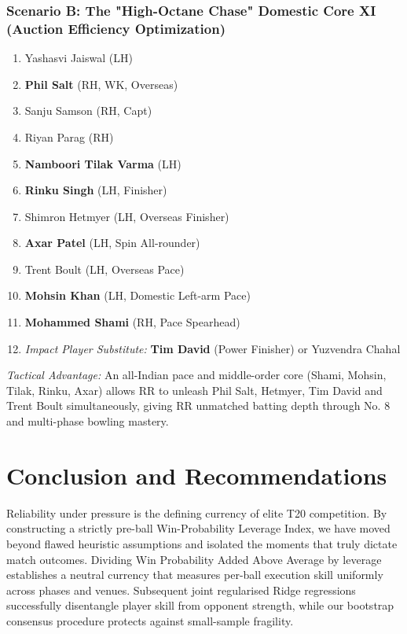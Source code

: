 \documentclass[11pt,a4paper]{article}
\begin{document}
\subsubsection{Scenario B: The "High-Octane Chase" Domestic Core XI (Auction Efficiency Optimization)}
\begin{enumerate}
    \item Yashasvi Jaiswal (LH)
    \item \textbf{Phil Salt} (RH, WK, Overseas)
    \item Sanju Samson (RH, Capt)
    \item Riyan Parag (RH)
    \item \textbf{Namboori Tilak Varma} (LH)
    \item \textbf{Rinku Singh} (LH, Finisher)
    \item Shimron Hetmyer (LH, Overseas Finisher)
    \item \textbf{Axar Patel} (LH, Spin All-rounder)
    \item Trent Boult (LH, Overseas Pace)
    \item \textbf{Mohsin Khan} (LH, Domestic Left-arm Pace)
    \item \textbf{Mohammed Shami} (RH, Pace Spearhead)
    \item \textit{Impact Player Substitute:} \textbf{Tim David} (Power Finisher) or Yuzvendra Chahal
\end{enumerate}
\textit{Tactical Advantage:} An all-Indian pace and middle-order core (Shami, Mohsin, Tilak, Rinku, Axar) allows RR to unleash Phil Salt, Hetmyer, Tim David and Trent Boult simultaneously, giving RR unmatched batting depth through No. 8 and multi-phase bowling mastery.

\section{Conclusion and Recommendations}
\label{sec:conclusion}

Reliability under pressure is the defining currency of elite T20 competition. By constructing a strictly pre-ball Win-Probability Leverage Index, we have moved beyond flawed heuristic assumptions and isolated the moments that truly dictate match outcomes. Dividing Win Probability Added Above Average by leverage establishes a neutral currency that measures per-ball execution skill uniformly across phases and venues. Subsequent joint regularised Ridge regressions successfully disentangle player skill from opponent strength, while our bootstrap consensus procedure protects against small-sample fragility.
\end{document}
